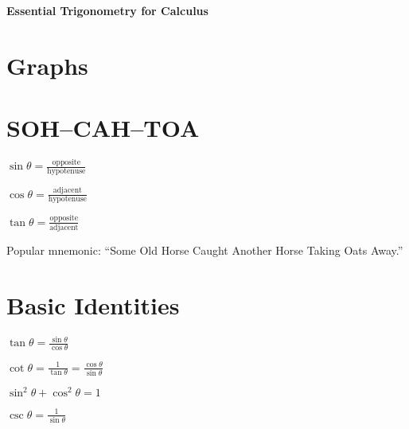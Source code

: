 \documentclass[12 pt]{article}
\begin{document}
\begin{center}
\textbf{\LARGE Essential Trigonometry for Calculus}
\end{center}
\vspace{.25in}
\pagestyle{empty}


\begin{multicols}{2}


\section*{Graphs}




\vfill


\vfill



\vfill


\section*{SOH--CAH--TOA}
$\displaystyle \sin\theta =\frac{\text{opposite}}{\text{hypotenuse}}$

\bigskip

$\displaystyle \cos\theta =\frac{\text{adjacent}}{\text{hypotenuse}}$

\bigskip

$\displaystyle \tan\theta =\frac{\text{opposite}}{\text{adjacent}}$

\bigskip

Popular mnemonic: ``Some Old Horse Caught Another Horse Taking Oats Away.''

\vfill
\null
\section*{Basic Identities}


\begin{multicols}{2}
$\displaystyle \tan \theta=\frac{\sin \theta}{\cos \theta}$

\bigskip

$\displaystyle\cot \theta=\frac{1}{\tan \theta}=\frac{\cos \theta}{\sin \theta}$

\bigskip

$\sin ^{2} \theta+\cos ^{2} \theta=1$

\bigskip
\vfill\null

\columnbreak
$\displaystyle\csc \theta=\frac{1}{\sin \theta}$

\bigskip


\end{multicols}
\end{multicols}
\end{document}
